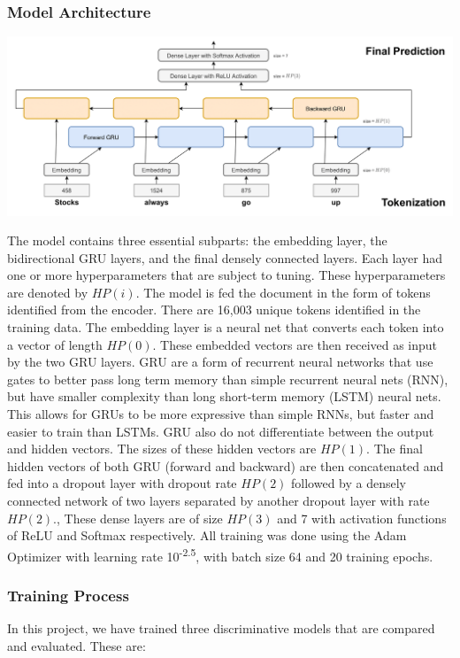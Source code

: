 \documentclass[11pt]{article}
\begin{document}
\subsubsection{Model Architecture}
\includegraphics[width=\textwidth,height=\textheight,keepaspectratio]{architecture.drawio.png}

\noindent The model contains three essential subparts: the embedding layer, the bidirectional GRU layers, and the final densely connected layers. Each layer had one or more hyperparameters that are subject to tuning. These hyperparameters are denoted by $HP(i)$. The model is fed the document in the form of tokens identified from the encoder. There are 16,003 unique tokens identified in the training data. The embedding layer is a neural net that converts each token into a vector of length $HP(0)$. These embedded vectors are then received as input by the two GRU layers. GRU are a form of recurrent neural networks that use gates to better pass long term memory than simple recurrent neural nets (RNN), but have smaller complexity than long short-term memory (LSTM) neural nets. This allows for GRUs to be more expressive than simple RNNs, but faster and easier to train than LSTMs. GRU also do not differentiate between the output and hidden vectors. The sizes of these hidden vectors are $HP(1)$. The final hidden vectors of both GRU (forward and backward) are then concatenated and fed into a dropout layer with dropout rate $HP(2)$ followed by a densely connected network of two layers separated by another dropout layer with rate $HP(2)$., These dense layers are of size $HP(3)$ and 7 with activation functions of ReLU and Softmax respectively. All training was done using the Adam Optimizer with learning rate 10\textsuperscript{-2.5}, with batch size 64 and 20 training epochs.  

\subsubsection{Training Process}
In this project, we have trained three discriminative models that are compared and evaluated. These are:
\end{document}
